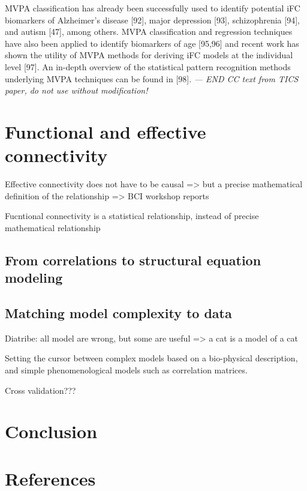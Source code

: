 \documentclass[5p]{elsarticle}
\begin{document}
MVPA classification has already been successfully used to identify potential iFC biomarkers of Alzheimer’s
disease [92], major depression [93], schizophrenia [94], and autism [47], among others. MVPA
classification and regression techniques have also been applied to identify biomarkers of age [95,96]
and recent work has shown the utility of MVPA methods for deriving iFC models at the individual
level [97]. An in-depth overview of the statistical pattern recognition methods underlying MVPA
techniques can be found in [98].
\emph{ --- END CC text from TICS paper, do not use without modification!}



\section{Functional and effective connectivity}

Effective connectivity does not have to be causal => but a precise mathematical
definition of the relationship => BCI workshop reports

Fucntional connectivity is a statistical relationship, instead of precise mathematical
relationship

\subsection{From correlations to structural equation modeling}

\cite{mcintosh1994}
\cite{marrelec2007}
\cite{marrelec2009}

\subsection{Matching model complexity to data}

Diatribe: all model are wrong, but some are useful => a cat is a model of a cat

Setting the cursor between complex models based on a bio-physical
description, and simple phenomenological models such as correlation
matrices.

\cite{mcintosh2010}

Cross validation???



\section{Conclusion}

{
\section*{References} \small 
 }

\end{document}
